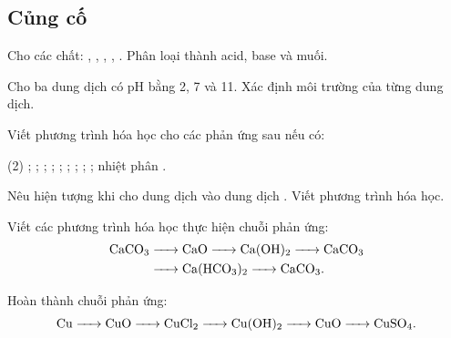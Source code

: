 \subsection{Củng cố}

\begin{tuluyen}
Cho các chất: , , , , . Phân loại thành acid, base và muối.
\end{tuluyen}

\begin{tuluyen}
Cho ba dung dịch có pH bằng 2, 7 và 11. Xác định môi trường của từng dung dịch.
\end{tuluyen}

\begin{tuluyen}
Viết phương trình hóa học cho các phản ứng sau nếu có:
\begin{tasks}(2)
\task {};
\task {};
\task {};
\task {};
\task {};
\task {};
\task {};
\task {};
\task {};
\task nhiệt phân .
\end{tasks}
\end{tuluyen}

\begin{tuluyen}
Nêu hiện tượng khi cho dung dịch  vào dung dịch . Viết phương trình hóa học.
\end{tuluyen}

\begin{tuluyen}
Viết các phương trình hóa học thực hiện chuỗi phản ứng:
\[
\begin{aligned}
\ce{CaCO3} &\ce{-> CaO -> Ca(OH)2 -> CaCO3}\\
&\ce{-> Ca(HCO3)2 -> CaCO3}.
\end{aligned}
\]
\end{tuluyen}

\begin{tuluyen}
Hoàn thành chuỗi phản ứng:
\[
\ce{Cu -> CuO -> CuCl2 -> Cu(OH)2 -> CuO -> CuSO4}.
\]
\end{tuluyen}

